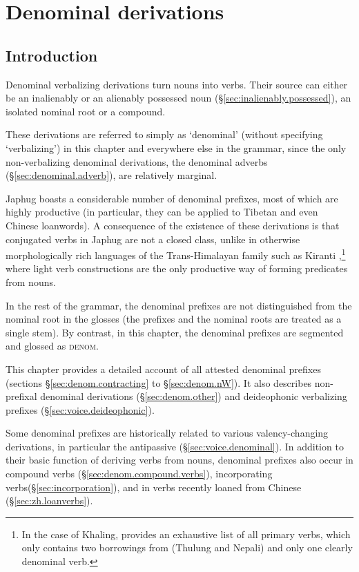 \chapter{Denominal derivations} \label{chap:denominal}


\section{Introduction}
Denominal verbalizing derivations  turn nouns into verbs. Their source can either be an inalienably or an alienably possessed noun (§\ref{sec:inalienably.possessed}), an isolated nominal root or a compound.

These derivations are referred to simply as `denominal' (without specifying `verbalizing') in this chapter and everywhere else in the grammar, since the only non-verbalizing denominal derivations, the denominal adverbs  (§\ref{sec:denominal.adverb}), are relatively marginal.

Japhug boasts a considerable number of denominal prefixes, most of which are highly productive (in particular, they can be applied to Tibetan and even Chinese loanwords). A consequence of the existence of these derivations is that conjugated verbs in Japhug are not a closed class, unlike in otherwise morphologically rich languages of the Trans-Himalayan family such as Kiranti \citep{jacques17pkiranti},\footnote{In the case of Khaling, \citet{jacques15khaling} provides an exhaustive list of all primary verbs, which only contains two borrowings from (Thulung and Nepali) and only one clearly denominal verb.} where light verb constructions are the only productive way of forming predicates from nouns.

In the rest of the grammar, the denominal prefixes are not distinguished from the nominal root in the glosses  (the prefixes and the nominal roots are treated as a single stem). By contrast, in this chapter, the denominal prefixes are segmented and glossed as \textsc{denom}.

This chapter provides a detailed account of all attested denominal prefixes (sections §\ref{sec:denom.contracting} to §\ref{sec:denom.nW}). It also describes non-prefixal denominal derivations (§\ref{sec:denom.other}) and  deideophonic verbalizing prefixes (§\ref{sec:voice.deideophonic}).

 Some denominal  prefixes are historically related to  various valency-changing derivations, in particular the antipassive (§\ref{sec:voice.denominal}).  In addition to their basic function of deriving verbs from nouns, denominal prefixes also occur in compound verbs (§\ref{sec:denom.compound.verbs}), incorporating  verbs(§\ref{sec:incorporation}), and in verbs recently loaned from Chinese (§\ref{sec:zh.loanverbs}).

